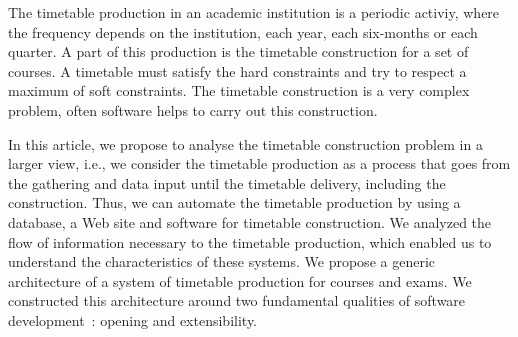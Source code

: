 The timetable production in an academic institution is a periodic
activiy, where the frequency depends on the institution, each
year, each six-months or each quarter. A part of this production
is the timetable construction for a set of courses. A timetable
must satisfy the hard constraints and try to respect a maximum of
soft constraints. The timetable construction is a very complex
problem, often software helps to carry out this construction.

In this article, we propose to analyse the timetable construction
problem in a larger view, i.e., we consider the timetable
production as a process that goes from the gathering and data
input until the timetable delivery, including the construction.
Thus, we can automate the timetable production by using a
database, a Web site and software for timetable construction. We
analyzed the flow of information necessary to the timetable
production, which enabled us to understand the characteristics of
these systems. We propose a generic architecture of a system of
timetable production for courses and exams. We constructed this
architecture around two fundamental qualities of software
development~: opening and extensibility.
